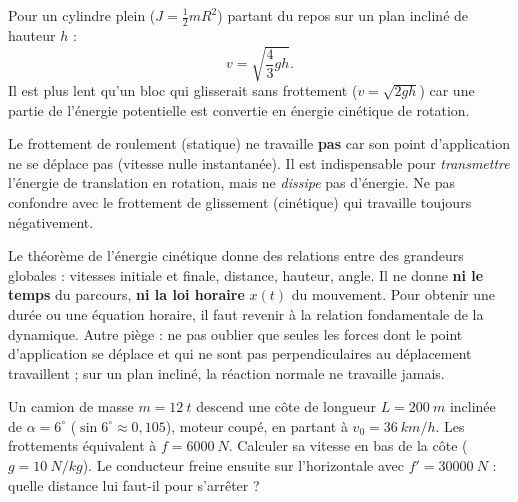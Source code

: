 \documentclass[11pt]{article}
\newcommand{\cle}[1]{{\popxbold\color{popdark}#1}}
\begin{document}
\begin{propriete}
Pour un cylindre plein ($J = \frac{1}{2}mR^2$) partant du repos sur un plan incliné de hauteur $h$ :
\[ v = \sqrt{\frac{4}{3}gh}. \]
Il est plus lent qu'un bloc qui glisserait sans frottement ($v = \sqrt{2gh}$) car une partie de l'énergie potentielle est convertie en énergie cinétique de rotation.
\end{propriete}

\begin{attention}
Le frottement de roulement (statique) ne travaille \textbf{pas} car son point d'application ne se déplace pas (vitesse nulle instantanée). Il est indispensable pour \emph{transmettre} l'énergie de translation en rotation, mais ne \emph{dissipe} pas d'énergie. Ne pas confondre avec le frottement de glissement (cinétique) qui travaille toujours négativement.
\end{attention}

\begin{attention}
Le théorème de l'énergie cinétique donne des relations entre des \cle{grandeurs globales} : vitesses initiale et finale, distance, hauteur, angle. Il ne donne \textbf{ni le temps} du parcours, \textbf{ni la loi horaire} $x(t)$ du mouvement. Pour obtenir une durée ou une équation horaire, il faut revenir à la relation fondamentale de la dynamique. Autre piège : ne pas oublier que seules les forces dont le point d'application se déplace et qui ne sont pas perpendiculaires au déplacement travaillent ; sur un plan incliné, la réaction normale ne travaille jamais.
\end{attention}

\begin{exercice}
Un camion de masse $m = \SI{12}{t}$ descend une côte de longueur $L = \SI{200}{m}$ inclinée de $\alpha = 6^{\circ}$ ($\sin 6^{\circ} \approx 0{,}105$), moteur coupé, en partant à $v_{0} = \SI{36}{km/h}$. Les frottements équivalent à $f = \SI{6000}{N}$. Calculer sa vitesse en bas de la côte ($g = \SI{10}{N/kg}$). Le conducteur freine ensuite sur l'horizontale avec $f' = \SI{30000}{N}$ : quelle distance lui faut-il pour s'arrêter ?
\end{exercice}
\end{document}
